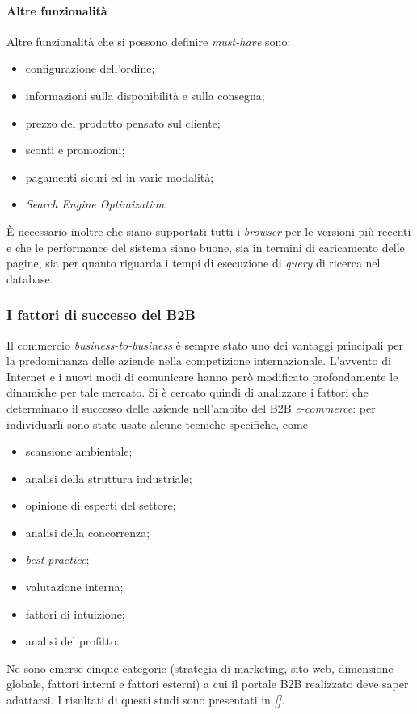 \paragraph{Altre funzionalità}
Altre funzionalità che si possono definire \textit{must-have} sono:
\begin{itemize}
	\item configurazione dell'ordine;
	\item informazioni sulla disponibilità e sulla consegna;
	\item prezzo del prodotto pensato sul cliente;
	\item sconti e promozioni;
	\item pagamenti sicuri ed in varie modalità;
	\item \textit{Search Engine Optimization}.
\end{itemize}
È necessario inoltre che siano supportati tutti i \textit{browser} per le versioni più recenti e che le performance del sistema siano buone, sia in termini di caricamento delle pagine, sia per quanto riguarda i tempi di esecuzione di \textit{query} di ricerca nel database.

\subsubsection{I fattori di successo del B2B}
Il commercio \textit{business-to-business} è sempre stato uno dei vantaggi principali per la predominanza delle aziende nella competizione internazionale. L'avvento di Internet e i nuovi modi di comunicare hanno però modificato profondamente le dinamiche per tale mercato. Si è cercato quindi di analizzare i fattori che determinano il successo delle aziende nell'ambito del B2B \textit{e-commerce}: per individuarli sono state usate alcune tecniche specifiche, come
\begin{itemize}
	\item scansione ambientale;
	\item analisi della struttura industriale;
	\item opinione di esperti del settore;
	\item analisi della concorrenza;
	\item \textit{best practice};
	\item valutazione interna;
	\item fattori di intuizione;
	\item analisi del profitto.
\end{itemize}
Ne sono emerse cinque categorie (strategia di marketing, sito web, dimensione globale, fattori interni e fattori esterni) a cui il portale B2B realizzato deve saper adattarsi. I risultati di questi studi sono presentati in \textit{ [\citeauthor{bib:b2bSuccessFactors}]}\autocite{bib:b2bSuccessFactors}.

